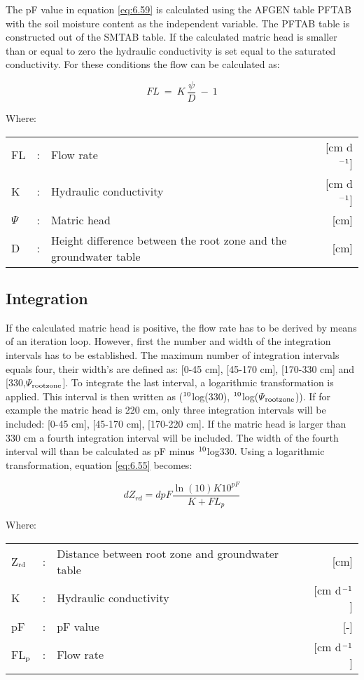 The pF value in equation \ref{eq:6.59} is calculated using the AFGEN table PFTAB with the soil
moisture content as the independent variable. The PFTAB table is constructed out of the
SMTAB table. If the calculated matric head is smaller than or equal to zero the hydraulic
conductivity is set equal to the saturated conductivity. For these conditions the flow can
be calculated as:

\begin{equation}
\label{eq:6.60}
FL~=~K\,{\frac{\psi }{D}} ~-~ 1
\end{equation}

Where:\\[5pt]
\begin{tabularx}{\textwidth}{llXr}
FL &:& Flow rate  & [cm d$^{{\rm -1}}$]\\
K  &:& Hydraulic conductivity  & [cm d$^{{\rm -1}}$]\\
$\Psi$ &:& Matric head  & [cm]\\
D &:& Height difference between the root zone and the groundwater table  & [cm]\\
\end{tabularx}

\subsection{Integration}
If the calculated matric head is positive, the flow rate has to be derived by means of an
iteration loop. However, first the number and width of the integration intervals has to be
established. The maximum number of integration intervals equals four, their width's are
defined as: [0-45 cm], [45-170 cm], [170-330 cm] and [330,$\Psi$$_{{\rm rootzone}}$].
To integrate the last interval, a logarithmic transformation is applied. This interval is then
written as ($^{{\rm 10}}$log(330), $^{{\rm 10}}$log($\Psi$$_{{\rm rootzone}}$)).
If for example the matric head is 220 cm, only three integration intervals will be
included: [0-45 cm], [45-170 cm], [170-220 cm]. If the matric head is larger than 330 cm
a fourth integration interval will be included. The width of the fourth interval will than be
calculated as pF minus $^{{\rm 10}}$log330. Using a logarithmic transformation, equation 
\ref{eq:6.55} becomes:

\begin{equation}
\label{eq:6.61}
dZ_{rd} = d pF{\frac{\ln(10) K 10^{pF} }{K + FL_{p}}}
\end{equation}

Where:\\[5pt]
\begin{tabularx}{\textwidth}{llXr}
Z$_{{\rm rd}}$ &:& Distance between root zone and groundwater table  & [cm]\\
K &:& Hydraulic conductivity  & [cm d$^{{\rm -1}}$]\\
pF &:& pF value  & [-]\\
FL$_{{\rm p}}$ &:& Flow rate  & [cm d$^{{\rm -1}}$]\\
\end{tabularx}

